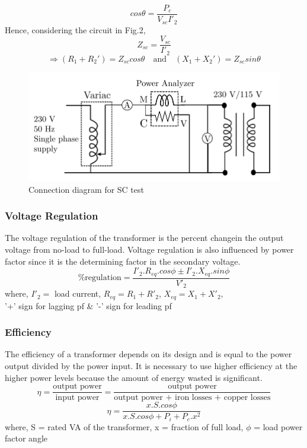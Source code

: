 \documentclass[12pt]{article}
\begin{document}
            $$cos\theta=\dfrac{P_c}{V_{sc}I'_2}$$
            Hence, considering the circuit in Fig.2,$$Z_{sc}=\dfrac{V_{sc}}{I'_2}$$
            \begin{equation}
                 \Rightarrow(R_1+R_2')=Z_{sc}cos\theta
                    \quad\text{and}\quad 
                (X_1+X_2')=Z_{sc}sin\theta
            \end{equation}
            \begin{figure}[H]
                \centering
                \includegraphics[width = 0.6\linewidth]{LAB-2/sc.png}
                \caption{Connection diagram for SC test}
            \end{figure}
            
        \subsubsection{Voltage Regulation}
            The voltage regulation of the transformer is the percent changein the output voltage from no-load to full-load. Voltage regulation is also influenced by power factor since it is the determining factor in the  secondary voltage.
            \begin{equation}
                 \% \text{regulation} = \frac{I'_2.R_{eq}.cos\phi \pm I'_2.X_{eq}.sin\phi}{V'_2}
            \end{equation}
            where, $I'_2 = $ load current,  $R_{eq} = R_1 + R'_2$,  $X_{eq} = X_1 + X'_2$,\\ \hspace{1cm} '+' sign for lagging pf \& '-' sign for leading pf
        \subsubsection{Efficiency}
            The efficiency of a transformer depends on its design and is equal to the power output divided by the power input. It is necessary to use higher efficiency at the higher power levels because the amount of energy wasted is significant.
            \begin{equation}
                 \eta = \frac{\text{output power}}{\text{input power}} = \frac{\text{output power}}{\text{output power + iron losses + copper losses}}
            \end{equation}
            \begin{equation}
                \eta = \frac{x.S.cos\phi}{x.S.cos\phi+P_i+P_c.x^2}
            \end{equation}
            where, S = rated VA of the transformer, x = fraction of full load, $\phi$ = load power factor angle
        
\end{document}
